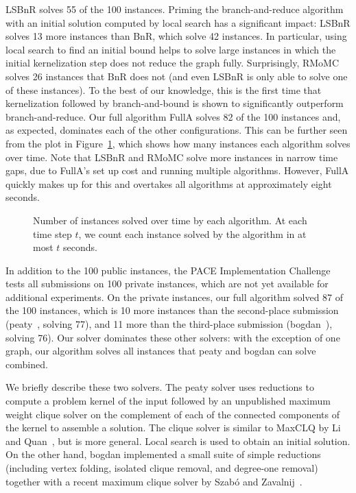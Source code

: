 \documentclass[twoside,leqno,twocolumn]{article}
\newcommand{\AlgName}[1]{\textsf{#1}}
\begin{document}
\AlgName{LSBnR} solves 55 of the 100 instances. Priming the branch-and-reduce algorithm with an initial solution computed by local search has a significant impact: \AlgName{LSBnR} solves 13 more instances than \AlgName{BnR}, which solve 42 instances. In particular, using local search to find an initial bound helps to solve large instances in which the initial kernelization step does not reduce the graph fully. Surprisingly, \AlgName{RMoMC} solves 26 instances that \AlgName{BnR} does not (and even \AlgName{LSBnR} is only able to solve one of these instances). To the best of our knowledge, this is the first time that kernelization followed by branch-and-bound is shown to significantly outperform branch-and-reduce. Our full algorithm \AlgName{FullA} solves 82 of the 100 instances and, as expected, dominates each of the other configurations. This can be further seen from the plot in Figure~\ref{fig:solution_time}, which shows how many instances each algorithm solves over time. Note that \AlgName{LSBnR} and \AlgName{RMoMC} solve more instances in narrow time gaps, due to \AlgName{FullA}'s set up cost and  running multiple algorithms. However, \AlgName{FullA} quickly makes up for this and overtakes all algorithms at approximately eight seconds.

\begin{figure}
    \centering
    
  \caption{Number of instances solved over time by each algorithm. At each time step $t$, we count each instance solved by the algorithm in at most $t$ seconds.} 
  \label{fig:solution_time}
\end{figure}

In addition to the 100 public instances, the PACE Implementation Challenge tests all submissions on 100 private instances, which are not yet available for additional experiments.
On the private instances, our full algorithm solved 87 of the 100 instances, which is 10 more instances than the second-place submission (\textsf{peaty}~\cite{james_trimble_2019_3082356}, solving 77), and 11 more than the third-place submission (\textsf{bogdan}~\cite{zbogdan_2019_3228802}), solving 76). Our solver dominates these other solvers: with the exception of one graph, our algorithm solves all instances that \textsf{peaty} and \textsf{bogdan} can solve combined. 

We briefly describe these two solvers. The \textsf{peaty} solver uses reductions to compute a problem kernel of the input followed by an unpublished maximum weight clique solver on the complement of each of the connected components of the kernel to assemble a solution. The clique solver is similar to MaxCLQ by Li and Quan~\cite{DBLP:conf/aaai/LiQ10}, but is more general. Local search is used to obtain an initial solution. On the other hand, \textsf{bogdan} implemented a small suite of simple reductions (including vertex folding, isolated clique removal, and degree-one removal) together with a recent maximum clique solver by Szab\'o and Zavalnij~\cite{szabo2018different}. 
\end{document}
